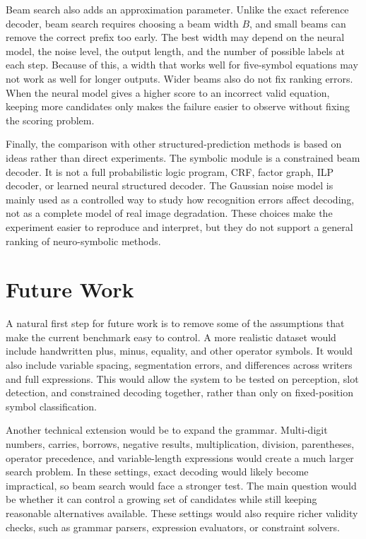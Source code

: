 \documentclass[12pt]{article}
\begin{document}
Beam search also adds an approximation parameter. Unlike the exact reference decoder, beam search requires choosing a beam width $B$, and small beams can remove the correct prefix too early. The best width may depend on the neural model, the noise level, the output length, and the number of possible labels at each step. Because of this, a width that works well for five-symbol equations may not work as well for longer outputs. Wider beams also do not fix ranking errors. When the neural model gives a higher score to an incorrect valid equation, keeping more candidates only makes the failure easier to observe without fixing the scoring problem.

Finally, the comparison with other structured-prediction methods is based on ideas rather than direct experiments. The symbolic module is a constrained beam decoder. It is not a full probabilistic logic program, CRF, factor graph, ILP decoder, or learned neural structured decoder. The Gaussian noise model is mainly used as a controlled way to study how recognition errors affect decoding, not as a complete model of real image degradation. These choices make the experiment easier to reproduce and interpret, but they do not support a general ranking of neuro-symbolic methods.

\section{Future Work}
A natural first step for future work is to remove some of the assumptions that make the current benchmark easy to control. A more realistic dataset would include handwritten plus, minus, equality, and other operator symbols. It would also include variable spacing, segmentation errors, and differences across writers and full expressions. This would allow the system to be tested on perception, slot detection, and constrained decoding together, rather than only on fixed-position symbol classification.

Another technical extension would be to expand the grammar. Multi-digit numbers, carries, borrows, negative results, multiplication, division, parentheses, operator precedence, and variable-length expressions would create a much larger search problem. In these settings, exact decoding would likely become impractical, so beam search would face a stronger test. The main question would be whether it can control a growing set of candidates while still keeping reasonable alternatives available. These settings would also require richer validity checks, such as grammar parsers, expression evaluators, or constraint solvers.
\end{document}
